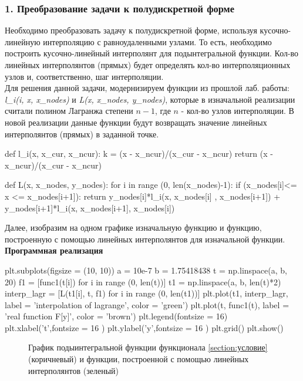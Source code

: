 \subsubsection{1. Преобразование задачи к полудискретной форме}
Необходимо преобразовать задачу к полудискретной форме, используя кусочно-линейную интерполяцию с равноудаленными узлами. То есть, необходимо построить кусочно-линейный интерполянт для подынтегральной функции. Кол-во линейных интерполянтов (прямых) будет определять кол-во интерполяционных узлов и, соответственно, шаг интерполяции. \\
Для решения данной задачи, модернизируем функции из прошлой лаб. работы: \textit{l_i(i, x, x_nodes)} и  \textit{L(x, x_nodes, y_nodes)}, которые в изначальной реализации считали полином Лагранжа степени $n-1$, где $n$ - кол-во узлов интерполяции. В новой реализации данные функции будут возвращать значение линейных интерполянтов (прямых) в заданной точке. 
\begin{python}
def l_i(x, x_cur, x_ncur):
  k = (x - x_ncur)/(x_cur - x_ncur)
  return (x - x_ncur)/(x_cur - x_ncur)

def L(x, x_nodes, y_nodes):
  for i in range (0, len(x_nodes)-1):
    if (x_nodes[i]<= x <= x_nodes[i+1]):
      return y_nodes[i]*l_i(x, x_nodes[i] , x_nodes[i+1]) + y_nodes[i+1]*l_i(x, x_nodes[i+1], x_nodes[i])

\end{python}
Далее, изобразим на одном графике изначальную функцию и функцию, построенную с помощью линейных интерполянтов для изначальной функции.
\\\textbf{Программная реализация}
\begin{python}
plt.subplots(figsize = (10, 10))
a = 10e-7
b = 1.75418438
t = np.linspace(a, b, 20)
f1 = [func1(t[i]) for i in range (0, len(t))]
t1 = np.linspace(a, b, len(t)*2)
interp_lagr = [L(t1[i], t, f1) for i in range (0, len(t1))]
plt.plot(t1, interp_lagr, label = 'interpolation of lagrange', color = 'green') 
plt.plot(t, func1(t), label = 'real function F[y]', color = 'brown')
plt.legend(fontsize = 16)
plt.xlabel('t',fontsize = 16 )
plt.ylabel('y',fontsize = 16 )
plt.grid()
plt.show()
\end{python}
\begin{figure}[h]
\caption{График подыинтегральной функции функционала \ref{section:условие} (коричневый) и функции, построенной с помощью линейных интерполянтов (зеленый)}
\end{figure}
